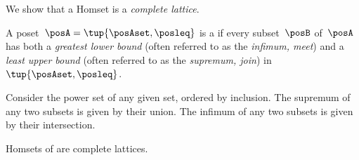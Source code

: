 We show that a \DP Homset is a \emph{complete lattice}.

\begin{definition}
    \label{def:complete-lattice}
    A poset~$\posA=\tup{\posAset,\posleq}$ is a \emph{} if every subset~$\posB$ of~$\posA$ has both a \emph{greatest lower bound} (often referred to as the \emph{infimum, meet}) and a \emph{least upper bound} (often referred to as the \emph{supremum, join}) in~$\tup{\posAset, \posleq}$.
\end{definition}

\begin{example}
    Consider the power set of any given set, ordered by inclusion. The supremum of any two subsets is given by their union.
    The infimum of any two subsets is given by their intersection.
\end{example}


\begin{lemma}
    \label{lem:DP-homsets-complete-lattice}
    Homsets of \DP are complete lattices.
\end{lemma}

